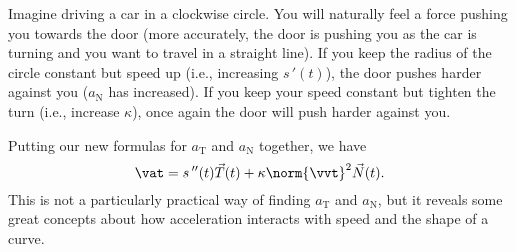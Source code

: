 Imagine driving a car in a clockwise circle. You will naturally feel a force pushing you towards the door (more accurately, the door is pushing you as the car is turning and you want to travel in a straight line). If you keep the radius of the circle constant but speed up (i.e., increasing $s\,'(t)$), the door pushes harder against you ($a_{\mathrm{N}}$ has increased). If you keep your speed constant but tighten the turn (i.e., increase $\kappa$), once again the door will push harder against you.

Putting our new formulas for $a_{\mathrm{T}}$ and $a_{\mathrm{N}}$ together, we have 
\[\vat = s\,''(t)\vec T(t) + \kappa\norm{\vvt}^2\vec N(t).\]
This is not a particularly practical way of finding $a_{\mathrm{T}}$ and $a_{\mathrm{N}}$, but it reveals some great concepts about how acceleration interacts with speed and the shape of a curve.

